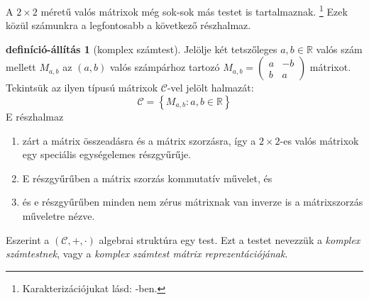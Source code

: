 \documentclass[a4paper, showtrims]{memoir}
\theoremstyle{plain}
\theoremstyle{remark}
\theoremstyle{definition}
\newtheorem{defprop}[proposition]{definíció-állítás}
\begin{document}
A $2\times 2$ méretű valós mátrixok még sok-sok más testet is tartalmaznak.%
\footnote{Karakterizációjukat lásd: \parencite{MR1415833}-ben.}
Ezek közül számunkra a legfontosabb a következő részhalmaz.
\begin{defprop}[komplex számtest]
	Jelölje két tetszőleges $a,b\in\mathbb{R}$ valós szám mellett $M_{a,b}$ az
	$\left( a,b \right)$ valós számpárhoz tartozó
	\(
	M_{a,b}
	=
	\begin{pmatrix}
		a & -b \\
		b & a
	\end{pmatrix}
	\)
	mátrixot.
	Tekintsük az ilyen típusú mátrixok $\mathcal{C}$-vel jelölt halmazát:
	\[
		\mathcal{C}
		=
		\left\{
		M_{a,b}
		:a,b\in\mathbb{R}
		\right\}
	\]
	E részhalmaz
	\begin{enumerate}
		\item
		      zárt a mátrix összeadásra és a mátrix szorzásra,
		      így a $2\times 2$-es valós mátrixok egy speciális egységelemes részgyűrűje.
		\item
		      E részgyűrűben a mátrix szorzás kommutatív művelet,
		      és
		\item
		      és e részgyűrűben minden nem zérus mátrixnak van inverze is a mátrixszorzás műveletre nézve.
	\end{enumerate}
	Eszerint a $\left( \mathcal{C},+,\cdot \right)$ algebrai struktúra egy test.
	Ezt a testet nevezzük a \emph{komplex számtestnek},
	vagy a \emph{komplex számtest mátrix reprezentációjának}.
\end{defprop}
\end{document}
